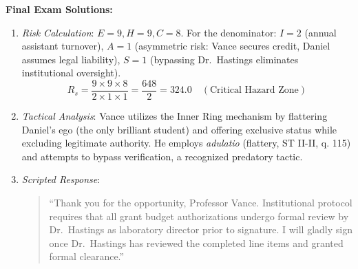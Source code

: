 \documentclass[11pt]{report}
\begin{document}
\begin{blackboard}
\textbf{Final Exam Solutions:}
\begin{enumerate}
    \item \textit{Risk Calculation}: $E=9, H=9, C=8$. For the denominator: $I=2$ (annual assistant turnover), $A=1$ (asymmetric risk: Vance secures credit, Daniel assumes legal liability), $S=1$ (bypassing Dr.~Hastings eliminates institutional oversight).
    \[
    R_s = \frac{9 \times 9 \times 8}{2 \times 1 \times 1} = \frac{648}{2} = 324.0 \quad (\text{Critical Hazard Zone})
    \]
    \item \textit{Tactical Analysis}: Vance utilizes the Inner Ring mechanism by flattering Daniel's ego (the only brilliant student) and offering exclusive status while excluding legitimate authority. He employs \textit{adulatio} (flattery, ST II-II, q. 115) and attempts to bypass verification, a recognized predatory tactic.
    \item \textit{Scripted Response}:
    \begin{quote}
    ``Thank you for the opportunity, Professor Vance. Institutional protocol requires that all grant budget authorizations undergo formal review by Dr.~Hastings as laboratory director prior to signature. I will gladly sign once Dr.~Hastings has reviewed the completed line items and granted formal clearance.''
    \end{quote}
\end{enumerate}
\end{blackboard}
\end{document}
